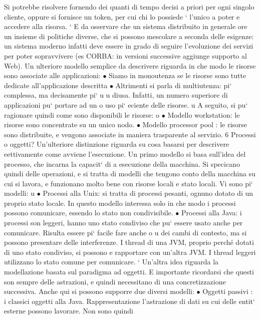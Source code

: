 \documentclass[a4paper,12pt]{article}
\begin{document}
Si potrebbe risolvere fornendo dei quanti di tempo decisi a priori per ogni singolo cliente, oppure si fornisce un
token, per cui chi lo possiede ` l'unico a poter
e
accedere alla risorsa.
`
E da osservare che un sistema distribuito in generale ore un insieme di
politiche diverse, che si possono mescolare a seconda delle esigenze: un sistema
moderno infatti deve essere in grado di seguire l'evoluzione dei servizi per poter
sopravvivere (es CORBA: in versioni successive aggiunge supporto al Web).
Un ulteriore modello semplice da descrivere riguarda in che modo le risorse
sono associate alle applicazioni:
$\bullet$ Siamo in monoutenza se le risorse sono tutte dedicate all'applicazione
descritta
$\bullet$ Altrimenti si parla di multiutenza: pi` complessa, ma decisamente pi`
u
u
diusa. Infatti, un numero superiore di applicazioni pu` portare ad un
o
uso pi` eciente delle risorse.
u
A seguito, si pu` ragionare quindi come sono disponibili le risorse:
o
$\bullet$ Modello workstation: le risorse sono concentrate su un unico nodo.
$\bullet$ Modello processor pool : le risorse sono distribuite, e vengono associate in
maniera trasparente al servizio.
6
Processi o oggetti?
Un'ulteriore distinzione riguarda su cosa basarsi per descrivere eettivamente
come avviene l'esecuzione.
Un primo modello si basa sull'idea del processo, che incarna la capacit` di
a
esecuzione della macchina. Si specicano quindi delle operazioni, e si tratta di
modelli che tengono conto della macchina su cui si lavora, e funzionano molto
bene con risorse locali e stato locali. Vi sono pi` modelli:
u
$\bullet$ Processi alla Unix: si tratta di processi pesanti, ognuno dotato di un
proprio stato locale. In questo modello interessa solo in che modo i processi
possono comunicare, essendo lo stato non condivisibile.
$\bullet$ Processi alla Java: i processi son leggeri, hanno uno stato condiviso che
pu` essere usato anche per comunicare. Risulta essere pi` facile fare anche
o
u
dei cambi di contesto, ma si possono presentare delle interferenze.
I thread di una JVM, proprio perché dotati di uno stato condiviso, si possono
e
rapportare con un'altra JVM. I thread leggeri utilizzano lo stato comune per
comunicare.
`
Un'altra idea riguarda la modellazione basata sul paradigma ad oggetti. E
importante ricordarsi che questi son sempre delle astrazioni, e quindi necessitano
di una concretizzazione successiva. Anche qui si possono supporre due diversi
modelli:
$\bullet$ Oggetti passivi : i classici oggetti alla Java. Rappresentazione l'astrazione
di dati su cui delle entit` esterne possono lavorare. Non sono quindi
\end{document}
